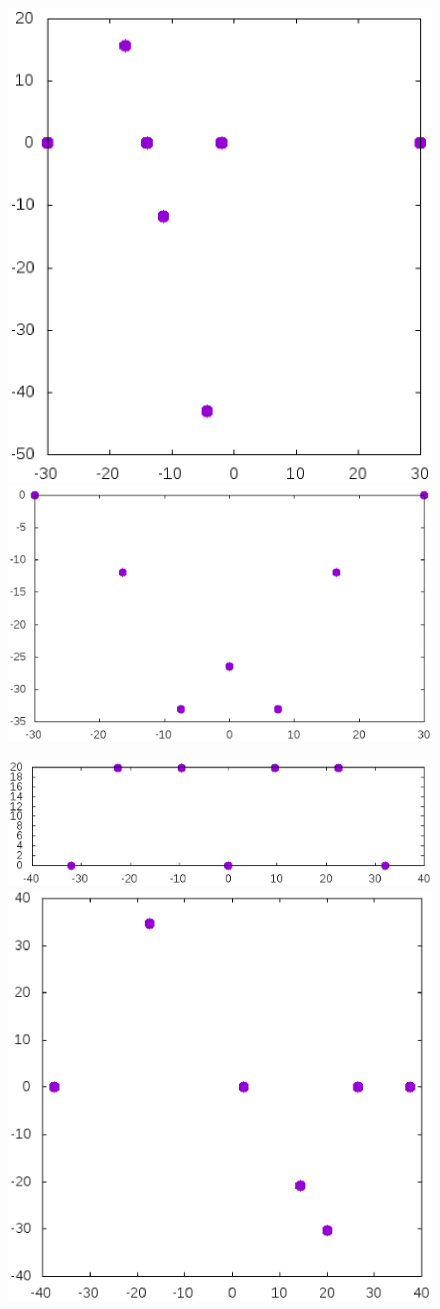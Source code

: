 \documentclass[12pt]{article}
\begin{document}
\begin{itemize}
\begin{figure}[htbp]
	\includegraphics[width=.48\linewidth]{Avdeev_7_60_1538484853808.eps}
	\hfill
	\includegraphics[width=.48\linewidth]{Avdeev_7_60_1538484854748.eps}
	\\
	\parbox{.48\linewidth}{\caption{}\label{Avdeev_7_60_1538484853808.eps}}
	\hfill
	\parbox{.48\linewidth}{\caption{}\label{Avdeev_7_60_1538484854748.eps}}
\end{figure}


\begin{figure}[htbp]
	\includegraphics[width=.48\linewidth]{Avdeev_7_64_1538484861024.eps}
	\hfill
	\includegraphics[width=.48\linewidth]{Avdeev_7_75_1538484880810.eps}
	\\
	\parbox{.48\linewidth}{\caption{}\label{Avdeev_7_64_1538484861024.eps}}
	\hfill
	\parbox{.48\linewidth}{\caption{}\label{Avdeev_7_75_1538484880810.eps}}
\end{figure}



\end{itemize}
\end{document}
